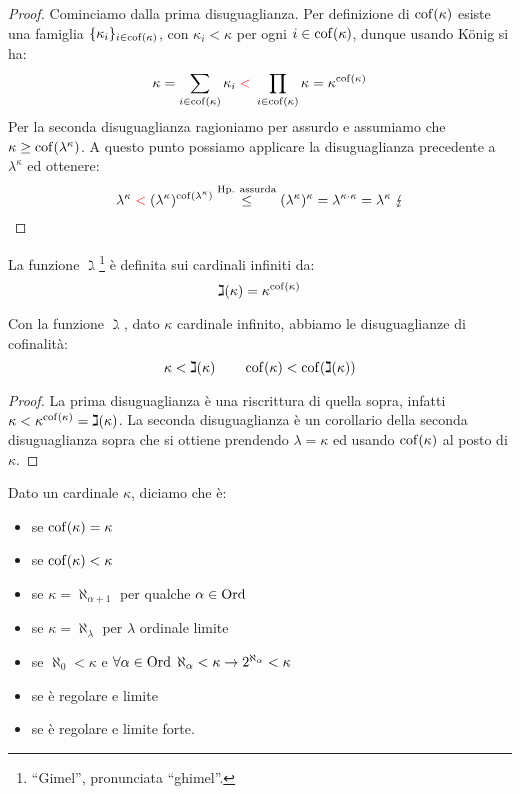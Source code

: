 \begin{proof}
	Cominciamo dalla prima disuguaglianza. Per definizione di $\operatorname{cof}(\kappa)$ esiste una famiglia $\{\kappa_i\}_{i \in \operatorname{cof}(\kappa)}$, con $\kappa_i < \kappa$ per ogni $i \in \operatorname{cof}(\kappa)$, dunque usando König si ha:
	\[ \kappa = \sum_{i \in \operatorname{cof}(\kappa)} \kappa_i \; \textcolor{red}{<} \; \prod_{i \in \operatorname{cof}(\kappa)} \kappa = \kappa^{\operatorname{cof}(\kappa)}
		\]
	Per la seconda disuguaglianza ragioniamo per assurdo e assumiamo che $\kappa \geq \operatorname{cof}(\lambda^\kappa)$. A questo punto possiamo applicare la disuguaglianza precedente a $\lambda^\kappa$ ed ottenere:
	\[ \lambda^\kappa \;\textcolor{red}{<}\; (\lambda^\kappa)^{\operatorname{cof}(\lambda^\kappa)} \overset{\text{Hp. assurda}}{\leq} (\lambda^{\kappa})^{\kappa} = \lambda^{\kappa \cdot \kappa} = \lambda^{\kappa} \;\lightning
		\]
\end{proof}

\begin{definition}
	La funzione $\gimel$\footnote{\;``Gimel'', pronunciata ``ghimel''.} è definita sui cardinali infiniti da:
	\[ \gimel(\kappa) = \kappa^{\operatorname{cof}(\kappa)}
		\]
\end{definition}

\begin{corollary}
	Con la funzione $\gimel$, dato $\kappa$ cardinale infinito, abbiamo le disuguaglianze di cofinalità:
	\[ \kappa < \gimel(\kappa) \qquad \operatorname{cof}(\kappa) < \operatorname{cof}(\gimel(\kappa))
		\]
\end{corollary}

\begin{proof}
	La prima disuguaglianza è una riscrittura di quella sopra, infatti $\kappa < \kappa^{\operatorname{cof}(\kappa)} = \gimel(\kappa)$. La seconda disuguaglianza è un corollario della seconda disuguaglianza sopra che
	si ottiene prendendo $\lambda = \kappa$ ed usando $\operatorname{cof}(\kappa)$ al posto di $\kappa$.
\end{proof}

\begin{definition}
	Dato un cardinale $\kappa$, diciamo che è:
	\begin{itemize}
		\item {} se $\operatorname{cof}(\kappa) = \kappa$
		\item {} se $\operatorname{cof}(\kappa) < \kappa$
		\item {} se $\kappa = \aleph_{\alpha + 1}$ per qualche $\alpha \in \operatorname{Ord}$
		\item {} se $\kappa = \aleph_{\lambda}$ per $\lambda$ ordinale limite
		\item {} se $\aleph_0 < \kappa$ e $\forall \alpha \in \operatorname{Ord} \; \aleph_\alpha < \kappa \rightarrow 2^{\aleph_\alpha} < \kappa$
		\item {} se è regolare e limite
		\item {} se è regolare e limite forte.
	\end{itemize}
\end{definition}

